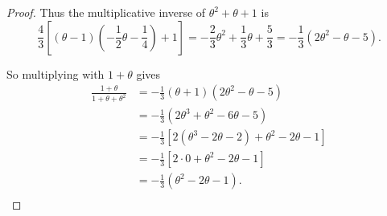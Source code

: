 \documentclass{article}
\begin{document}
\begin{proof}
    Thus the multiplicative inverse of $\theta^2+\theta+1$ is
    \[\frac{4}{3} \left[(\theta-1)
    \left(-\frac{1}{2}\theta-\frac{1}{4}\right) +1 \right]
    =-\frac{2}{3}\theta^2 +\frac{1}{3}\theta +\frac{5}{3} =-\frac{1}{3}
    \left(2\theta^2-\theta-5 \right).\]

    So multiplying with $1+\theta$ gives
    \begin{align*}
      \frac{1+\theta}{1+\theta+\theta^2} &=-\frac{1}{3} (\theta+1)
        \left(2\theta^2-\theta-5 \right) \\
      &=-\frac{1}{3} \left(2\theta^3+\theta^2-6\theta-5 \right)\\
      &=-\frac{1}{3} \left[2(\theta^3-2\theta-2) +\theta^2-2\theta-1
        \right]\\
      &=-\frac{1}{3} \left[2\cdot0 +\theta^2-2\theta-1 \right]\\
      &=-\frac{1}{3} \left(\theta^2-2\theta-1 \right).\\
    \end{align*}
  \end{proof}
\end{document}
